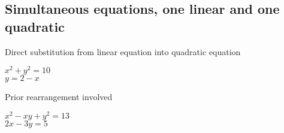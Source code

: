\documentclass{article}
\begin{document}
\subsection{Simultaneous equations, one linear and one quadratic}

Direct substitution from linear equation into quadratic equation
\vspace{-1.2cm}
\begin{flushright}
\(x^2 + y^2 = 10\) \\
\(y = 2 - x\)
\end{flushright}

Prior rearrangement involved
\vspace{-1.2cm}
\begin{flushright}
\(x^2 - xy + y^2 = 13\) \\
\(2x - 3y = 5\)
\end{flushright}
\end{document}
